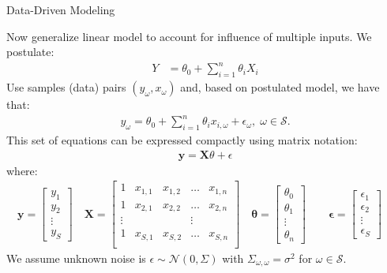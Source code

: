 \documentclass[handout,9pt]{beamer}
\begin{document}
%
\begin{frame}{Data-Driven Modeling}

Now generalize linear model to account for influence of multiple inputs. We postulate:
\begin{align*}
Y&=\theta_0+\sum_{i=1}^n\theta_iX_i
\end{align*}
Use samples (data) pairs $(y_\omega,x_\omega)$ and, based on postulated model, we have that:
\begin{align*}
y_\omega=\theta_0+\sum_{i=1}^n\theta_i x_{i,\omega} + \epsilon_\omega,\; \omega \in \mathcal{S}.
\end{align*}
This set of equations can be expressed compactly using matrix notation:
\begin{align*}
\mathbf{y}=\mathbf{X}\theta + \epsilon
\end{align*}
where:
\begin{align*}
\mathbf{y}=\left[\begin{array}{c}y_1\\y_2\\\vdots \\ y_S\end{array}\right]\quad 
\mathbf{X}=\left[\begin{array}{ccccc}1&x_{1,1}&x_{1,2}&\hdots&x_{1,n}\\
1&x_{2,1}&x_{2,2}&\hdots&x_{2,n}\\
\vdots&&&\vdots\\
1&x_{S,1}&x_{S,2}&\hdots&x_{S,n}\\
\end{array}\right]\quad \mathbf{\theta}=\left[\begin{array}{c}\theta_0\\\theta_1\\\vdots \\ \theta_n\end{array}\right]\quad 
\quad \mathbf{\epsilon}=\left[\begin{array}{c}\epsilon_1\\\epsilon_2\\\vdots \\ \epsilon_S\end{array}\right]\quad 
\end{align*}
We assume unknown noise is $\epsilon\sim \mathcal{N}(0,\Sigma)$ with $\Sigma_{\omega,\omega}=\sigma^2$ for $\omega\in\mathcal{S}$. 

\end{frame}
\end{document}
